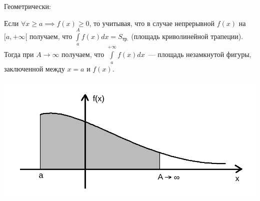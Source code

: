 \documentclass[../../main.tex]{subfiles}
\begin{document}
Геометрически:

Если $\forall x \geq a \implies f(x) \geq 0$, то учитывая, что в случае 
непрерывной $f(x)$ на $[a, +\infty[$ получаем, что
$\int\limits_a^A f(x)dx = S_{\text{тр.}}$ (площадь криволинейной трапеции). 
Тогда при
$A \to \infty$ получаем, что $\int\limits_a^{+\infty} f(x)dx$~--- площадь 
незамкнутой фигуры, заключенной между $x = a$ и $f(x)$.

\includegraphics[scale = 0.3]{lec7_1.png}
\end{document}
